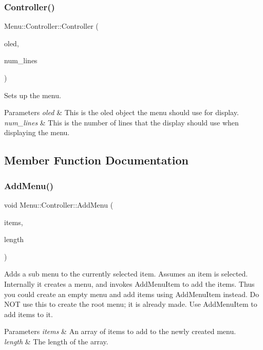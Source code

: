 \subsubsection{\texorpdfstring{Controller()}{Controller()}}
{\footnotesize\ttfamily Menu\+::\+Controller\+::\+Controller (\begin{DoxyParamCaption}\item[{\hyperlink{class_o_l_e_d}{O\+L\+ED} \&}]{oled,  }\item[{uint8\+\_\+t}]{num\+\_\+lines }\end{DoxyParamCaption})}

Sets up the menu. 
\begin{DoxyParams}{Parameters}
{\em oled} & This is the oled object the menu should use for display. \\
\hline
{\em num\+\_\+lines} & This is the number of lines that the display should use when displaying the menu. \\
\hline
\end{DoxyParams}


\subsection{Member Function Documentation}
\hypertarget{class_menu_1_1_controller_ab530ec11f04b96254b93961d26152d3c}{}\label{class_menu_1_1_controller_ab530ec11f04b96254b93961d26152d3c} 
\subsubsection{\texorpdfstring{Add\+Menu()}{AddMenu()}}
{\footnotesize\ttfamily void Menu\+::\+Controller\+::\+Add\+Menu (\begin{DoxyParamCaption}\item[{\hyperlink{struct_menu_1_1_item}{Item} $\ast$$\ast$}]{items,  }\item[{uint8\+\_\+t}]{length }\end{DoxyParamCaption})}

Adds a sub menu to the currently selected item. Assumes an item is selected. Internally it creates a menu, and invokes Add\+Menu\+Item to add the items. Thus you could create an empty menu and add items using Add\+Menu\+Item instead. Do N\+OT use this to create the root menu; it is already made. Use Add\+Menu\+Item to add items to it. 
\begin{DoxyParams}{Parameters}
{\em items} & An array of items to add to the newly created menu. \\
\hline
{\em length} & The length of the array. \\
\hline
\end{DoxyParams}
\hypertarget{class_menu_1_1_controller_a777d65ba4f168aed6c1c44022ca4c658}{}\label{class_menu_1_1_controller_a777d65ba4f168aed6c1c44022ca4c658} 
